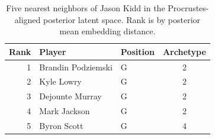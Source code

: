 \begin{table}[htbp]
  \centering\small
  \begin{tabular}{rllc}
    \toprule
    Rank & Player & Position & Archetype \\
    \midrule
    1 & Brandin Podziemski & G & 2 \\
    2 & Kyle Lowry & G & 2 \\
    3 & Dejounte Murray & G & 2 \\
    4 & Mark Jackson & G & 2 \\
    5 & Byron Scott & G & 4 \\
    \bottomrule
  \end{tabular}
  \caption{Five nearest neighbors of Jason Kidd in the Procrustes-aligned posterior latent space. Rank is by posterior mean embedding distance.}
  \label{tab:Jason_Kidd_neighbors}
\end{table}

